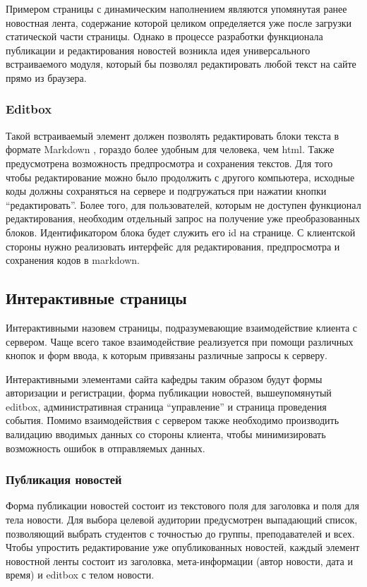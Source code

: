\documentclass[14pt]{extarticle}
\begin{document}
Примером страницы с динамическим наполнением являются упомянутая ранее новостная лента, содержание которой целиком определяется уже после загрузки статической части страницы. Однако в процессе разработки функционала публикации и редактирования новостей возникла идея универсального встраиваемого модуля, который бы позволял редактировать любой текст на сайте прямо из браузера.


\subsubsection{Editbox}
Такой встраиваемый элемент должен позволять редактировать блоки текста в формате Markdown \cite{markdown}, гораздо более удобным для человека, чем html. Также предусмотрена возможность предпросмотра и сохранения текстов. Для того чтобы редактирование можно было продолжить с другого компьютера, исходные коды должны сохраняться на сервере и подгружаться при нажатии кнопки \enquote{редактировать}. Более того, для пользователей, которым не доступен функционал редактирования, необходим отдельный запрос на получение уже преобразованных блоков. Идентификатором блока будет служить его id на странице. С клиентской стороны нужно реализовать интерфейс для редактирования, предпросмотра и сохранения кодов в markdown.

\subsection{Интерактивные страницы}
Интерактивными назовем страницы, подразумевающие взаимодействие клиента с сервером. Чаще всего такое взаимодействие реализуется при помощи различных кнопок и форм ввода, к которым привязаны различные запросы к серверу.

Интерактивными элементами сайта кафедры таким образом будут формы авторизации и регистрации, форма публикации новостей, вышеупомянутый editbox, административная страница \enquote{управление} и страница проведения события. Помимо взаимодействия с сервером также необходимо производить валидацию вводимых данных со стороны клиента, чтобы минимизировать возможность ошибок в отправляемых данных.


\subsubsection{Публикация новостей}
Форма публикации новостей состоит из текстового поля для заголовка и поля для тела новости. Для выбора целевой аудитории предусмотрен выпадающий список, позволяющий выбрать студентов с точностью до группы, преподавателей и всех. Чтобы упростить редактирование уже опубликованных новостей, каждый элемент новостной ленты состоит из заголовка, мета-информации (автор новости, дата и время) и editbox с телом новости.
\end{document}
